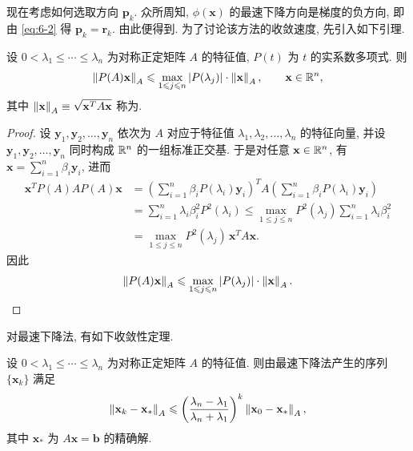 现在考虑如何选取方向 $\mathbf{p}_k$. 众所周知, $\phi(\mathbf{x})$ 的最速下降方向是梯度的负方向, 即由 \eqref{eq:6-2} 得 $\mathbf{p}_k=\mathbf{r}_k$. 由此便得到. 为了讨论该方法的收敛速度, 先引入如下引理.

\begin{lemma}
\label{lem:6-1}
设 $0<\lambda_1\leqslant\cdots\leqslant\lambda_n$ 为对称正定矩阵 $A$ 的特征值, $P(t)$ 为 $t$ 的实系数多项式. 则
\[
  \left\|P(A)\mathbf{x}\right\|_A
  \leqslant\max_{1\leqslant j\leqslant n}|P(\lambda_j)|\cdot\left\|\mathbf{x}\right\|_A,
  \qquad\mathbf{x}\in\mathbb{R}^n,
\]
其中 $\left\|\mathbf{x}\right\|_A\equiv\sqrt{\mathbf{x}^TA\mathbf{x}}$ 称为.
\end{lemma}

\begin{proof}
设 $\mathbf{y}_1,\mathbf{y}_2,\ldots,\mathbf{y}_n$ 依次为 $A$ 对应于特征值 $\lambda_1,\lambda_2,\ldots,\lambda_n$ 的特征向量, 并设 $\mathbf{y}_1,\mathbf{y}_2,\ldots,\mathbf{y}_n$ 同时构成 $\mathbb{R}^n$ 的一组标准正交基. 于是对任意 $\mathbf{x}\in\mathbb{R}^n$, 有 $\mathbf{x}=\sum_{i=1}^n\beta_i\mathbf{y}_i$, 进而
\[
  \begin{aligned}
    \mathbf{x}^TP(A)AP(A)\mathbf{x}
    &=\left(\sum_{i=1}^n\beta_iP(\lambda_i)\mathbf{y}_i\right)^T
      A\left(\sum_{i=1}^n\beta_iP(\lambda_i)\mathbf{y}_i\right)\\
    &=\sum_{i=1}^n\lambda_i\beta_i^2P^2(\lambda_i)
     \leqslant\max_{1\leqslant j\leqslant n}P^2(\lambda_j)
      \sum_{i=1}^n\lambda_i\beta_i^2\\
    &=\max_{1\leqslant j\leqslant n}P^2(\lambda_j)\,\mathbf{x}^TA\mathbf{x}.
  \end{aligned}
\]
因此
\[
  \left\|P(A)\mathbf{x}\right\|_A
  \leqslant\max_{1\leqslant j\leqslant n}|P(\lambda_j)|\cdot\left\|\mathbf{x}\right\|_A.
  \qedhere
\]
\end{proof}

对最速下降法, 有如下收敛性定理.

\begin{theorem}
\label{thm:6-2}
设 $0<\lambda_1\leqslant\cdots\leqslant\lambda_n$ 为对称正定矩阵 $A$ 的特征值. 则由最速下降法产生的序列 $\{\mathbf{x}_k\}$ 满足
\[
  \left\|\mathbf{x}_k-\mathbf{x}_*\right\|_A
  \leqslant\left(\frac{\lambda_n-\lambda_1}{\lambda_n+\lambda_1}\right)^k
  \left\|\mathbf{x}_0-\mathbf{x}_*\right\|_A,
\]
其中 $\mathbf{x}_*$ 为 $A\mathbf{x}=\mathbf{b}$ 的精确解.
\end{theorem}

